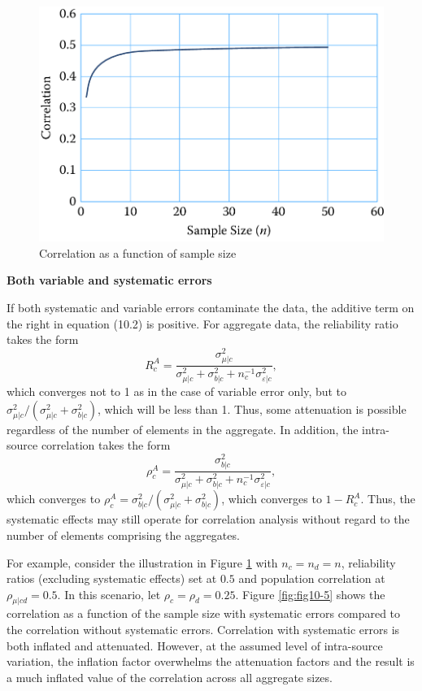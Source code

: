 \documentclass[]{krantz}
\begin{document}
\begin{figure}

{\centering \includegraphics[width=0.7\linewidth]{ChapterError/figures/fig10-4} 

}

\caption{Correlation as a function of sample size}\label{fig:fig10-4}
\end{figure}

\textbf{Both variable and systematic errors}

If both systematic and variable errors contaminate the data, the
additive term on the right in equation (10.2) is positive. For aggregate
data, the reliability ratio takes the form \[\label{eq:10-1.8}
R_c^A = \frac{{\sigma_{\mu |c}^2}}{{\sigma_{\mu |c}^2 + \sigma
_{b|c}^2 + n_c^{ - 1}\sigma_{\varepsilon |c}^2}},\] which converges not
to 1 as in the case of variable error only, but to
\(\sigma_{\mu \vert c}^2 / (\sigma_{\mu \vert c}^2 + \sigma_{b\vert c}^2)\),
which will be less than 1. Thus, some attenuation is possible regardless
of the number of elements in the aggregate. In addition, the
intra-source correlation takes the form \[\label{eq:10-1.9}
\rho_c^A = \frac{{\sigma_{b|c}^2}}{{\sigma_{\mu |c}^2 +
\sigma_{b|c}^2 + n_c^{ - 1}\sigma_{\varepsilon |c}^2}},\] which
converges to
\(\rho_c^A = \sigma_{b|c}^2/(\sigma_{\mu |c}^2 + \sigma _{b|c}^2)\),
which converges to \(1 - R_c^A\). Thus, the systematic effects may still
operate for correlation analysis without regard to the number of
elements comprising the aggregates.

For example, consider the illustration in Figure \ref{fig:fig10-4} with
\(n_c = n_d = n\), reliability ratios (excluding systematic effects) set
at \(0.5\) and population correlation at \(\rho_{\mu \vert cd} = 0.5\).
In this scenario, let \(\rho_c = \rho_d = 0.25\). Figure
\ref{fig:fig10-5} shows the correlation as a function of the sample size
with systematic errors compared to the correlation without systematic
errors. Correlation with systematic errors is both inflated and
attenuated. However, at the assumed level of intra-source variation, the
inflation factor overwhelms the attenuation factors and the result is a
much inflated value of the correlation across all aggregate sizes.
\end{document}
